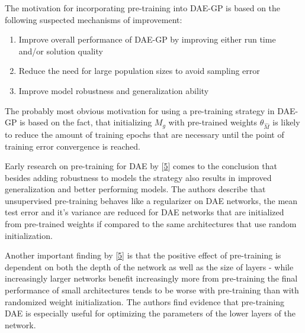 \documentclass[
  11pt,
]{article}
\providecommand{\tightlist}{%
  \setlength{\itemsep}{0pt}\setlength{\parskip}{0pt}}
\begin{document}
The motivation for incorporating pre-training into DAE-GP is based on the following suspected mechanisms of improvement:

\begin{enumerate}
\def\labelenumi{\arabic{enumi}.}
\tightlist
\item
  Improve overall performance of DAE-GP by improving either run time and/or solution quality
\item
  Reduce the need for large population sizes to avoid sampling error
\item
  Improve model robustness and generalization ability
\end{enumerate}

The probably most obvious motivation for using a pre-training strategy in DAE-GP is based on the fact, that initializing \(M_g\) with pre-trained weights \(\theta_{\hat{M}}\) is likely to reduce the amount of training epochs that are necessary until the point of training error convergence is reached.

Early research on pre-training for DAE by {[}\protect\hyperlink{ref-pmlr-v5-erhan09a}{5}{]} comes to the conclusion that besides adding robustness to models the strategy also results in improved generalization and better performing models. The authors describe that unsupervised pre-training behaves like a regularizer on DAE networks, the mean test error and it's variance are reduced for DAE networks that are initialized from pre-trained weights if compared to the same architectures that use random initialization.

Another important finding by {[}\protect\hyperlink{ref-pmlr-v5-erhan09a}{5}{]} is that the positive effect of pre-training is dependent on both the depth of the network as well as the size of layers - while increasingly larger networks benefit increasingly more from pre-training the final performance of small architectures tends to be worse with pre-training than with randomized weight initialization.
The authors find evidence that pre-training DAE is especially useful for optimizing the parameters of the lower layers of the network.
\end{document}
